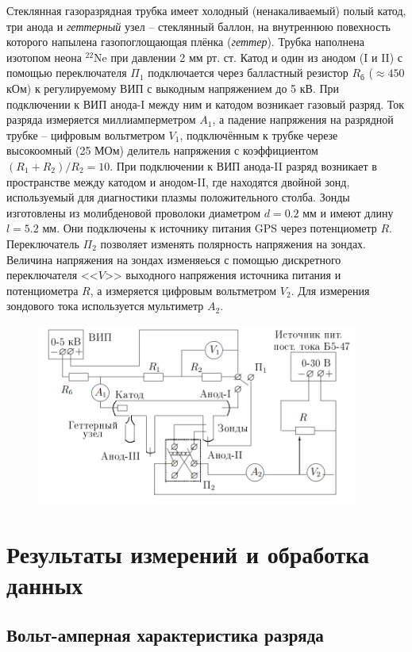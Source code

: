 \documentclass[a4paper]{article}
\theoremstyle{definition}
\theoremstyle{remark}
\begin{document}
    Стеклянная газоразрядная трубка имеет холодный (ненакаливаемый) полый катод, три анода и \textit{геттерный} узел -- стеклянный баллон, на внутреннюю повехность которого напылена газопоглощающая плёнка (\textit{геттер}). Трубка наполнена изотопом неона $^22$Ne при давлении 2 мм рт. ст. Катод и один из анодом (I и II) с помощью переключателя $\Pi_1$ подключается через балластный резистор $R_\text{б}$ ($\approx 450$ кОм) к регулируемому ВИП с выкодным напряжением до 5 кВ.
    При подключении к ВИП анода-I между ним и катодом возникает газовый разряд. Ток разряда измеряется миллиамперметром $A_1$, а падение напряжения на разрядной трубке -- цифровым вольтметром $V_1$, подключённым к трубке черезе высокоомный (25 МОм) делитель напряжения с коэффициентом $(R_1+R_2)/R_2 = 10$.
    При подключении к ВИП анода-II разряд возникает в пространстве между катодом и анодом-II, где находятся двойной зонд, используемый для диагностики плазмы положительного столба. Зонды изготовлены из молибденовой проволоки диаметром $d = 0.2$ мм и имеют длину $l = 5.2$ мм. Они подключены к источнику питания GPS через потенциометр $R$. Переключатель $\Pi_2$ позволяет изменять полярность напряжения на зондах. Величина напряжения на зондах изменяеься с помощью дискретного переключателя <<$V$>> выходного напряжения источника питания и потенциометра $R$, а измеряется цифровым вольтметром $V_2$. Для измерения зондового тока используется мультиметр $A_2$.

    \begin{figure}[h!]
        \centering
        \includegraphics[width = 300pt]{image/scheme.png}
    \end{figure}

\section{Результаты измерений и обработка данных}

\subsection{Вольт-амперная характеристика разряда}
\end{document}
